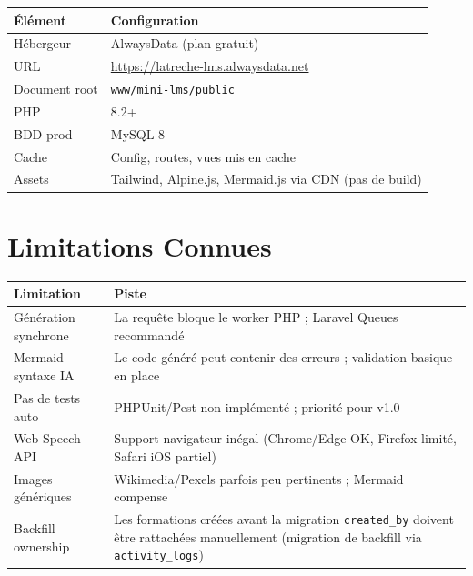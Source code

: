 \documentclass[10pt,a4paper]{article}
\begin{document}
\begin{table}[H]
\centering\renewcommand{\arraystretch}{1.3}
\begin{tabularx}{\textwidth}{p{3cm} X}
\toprule \textbf{\'El\'ement} & \textbf{Configuration} \\ \midrule
H\'ebergeur & AlwaysData (plan gratuit) \\
URL & \url{https://latreche-lms.alwaysdata.net} \\
Document root & \texttt{www/mini-lms/public} \\
PHP & 8.2+ \\
BDD prod & MySQL 8 \\
Cache & Config, routes, vues mis en cache \\
Assets & Tailwind, Alpine.js, Mermaid.js via CDN (pas de build) \\
\bottomrule
\end{tabularx}
\end{table}

\section{Limitations Connues}

\begin{warnbox}
\begin{table}[H]
\renewcommand{\arraystretch}{1.3}
\begin{tabularx}{\textwidth}{p{3.5cm} X}
\toprule \textbf{Limitation} & \textbf{Piste} \\ \midrule
G\'en\'eration synchrone & La requ\^ete bloque le worker PHP ; Laravel Queues recommand\'e \\
Mermaid syntaxe IA & Le code g\'en\'er\'e peut contenir des erreurs ; validation basique en place \\
Pas de tests auto & PHPUnit/Pest non impl\'ement\'e ; priorit\'e pour v1.0 \\
Web Speech API & Support navigateur in\'egal (Chrome/Edge OK, Firefox limit\'e, Safari iOS partiel) \\
Images g\'en\'eriques & Wikimedia/Pexels parfois peu pertinents ; Mermaid compense \\
Backfill ownership & Les formations cr\'e\'ees avant la migration \texttt{created\_by} doivent \^etre rattach\'ees manuellement (migration de backfill via \texttt{activity\_logs}) \\
\bottomrule
\end{tabularx}
\end{table}
\end{warnbox}
\end{document}
